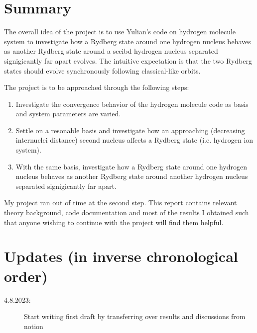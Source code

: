 \documentclass [11pt,a4paper]{report}
\begin{document}
\firstpage%
%

\msk\noindent%

%
%
%
%
\section{Summary}
\label{sec:summary}
The overall idea of the project is to use Yulian's code on hydrogen molecule system to investigate how a Rydberg state around one hydrogen nucleus behaves as another Rydberg state around a secibd hydrogen nucleus separated signigicantly far apart evolves. The intuitive expectation is that the two Rydberg states should evolve synchronously following classical-like orbits.

The project is to be approached through the following steps:
\begin{enumerate}
  \item Investigate the convergence behavior of the hydrogen molecule code as basis and system parameters are varied.
  \item Settle on a resonable basis and investigate how an approaching (decreasing internuclei distance) second nucleus affects a Rydberg state (i.e. hydrogen ion system).
  \item With the same basis, investigate how a Rydberg state around one hydrogen nucleus behaves as another Rydberg state around another hydrogen nucleus separated signigicantly far apart.
\end{enumerate}

My project ran out of time at the second step. This report contains relevant theory background, code documentation and most of the results I obtained such that anyone wishing to continue with the project will find them helpful.

%
%
\section{Updates (in inverse chronological order)}
\label{sec:updates}

\begin{description}
   \item[4.8.2023:] Start writing first draft by transferring over results and discussions from notion
\end{description}


%
%
\end{document}
